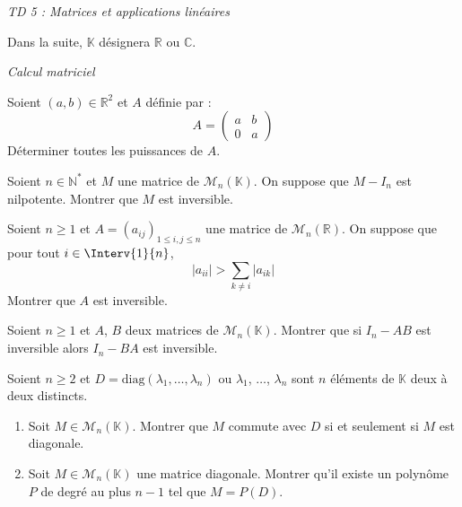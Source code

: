 \documentclass[a4paper,10pt]{report}
\begin{document}
\everymath{\displaystyle}

\begin{center}
\textit{{ {\huge TD 5 : Matrices et applications linéaires }}}
\end{center}

\bigskip

\noindent Dans la suite, $\mathbb{K}$ désignera $\mathbb{R}$ ou $\mathbb{C}$.

\medskip

\begin{center}
\textit{{ {\large Calcul matriciel}}}
\end{center}

\begin{Exercice}{} Soient $(a,b) \in \mathbb{R}^2$ et $A$ définie par :
$$ A = \begin{pmatrix}
a & b \\
0  & a
\end{pmatrix}$$ 
Déterminer toutes les puissances de $A$.
\end{Exercice}

\begin{Exercice}{} Soient $n \in \mathbb{N}^*$ et $M$ une matrice de $\mathcal{M}_n(\mathbb{K})$. On suppose que $M-I_n$ est nilpotente. Montrer que $M$ est inversible.
\end{Exercice}

 \begin{Exercice}{} Soient $n \geq 1$ et $A = (a_{ij})_{1 \leq i,j \leq n}$ une matrice de $\mathcal{M}_n(\mathbb{R})$. On suppose que pour tout $i \in \Interv{1}{n}$,
$$ \vert a_{ii} \vert > \sum_{k \neq i} \vert a_{ik} \vert $$
Montrer que $A$ est inversible.
\end{Exercice}

\begin{Exercice}{} Soient $n\geq 1$ et $A$, $B$ deux matrices de $\mathcal{M}_n(\mathbb{K})$. Montrer que si $I_n - AB$ est inversible alors $I_n - BA$ est inversible.
\end{Exercice} 

\begin{Exercice}{} Soient $n \geq 2$ et $D= \textrm{diag}(\lambda_1, \ldots, \lambda_n)$ ou $\lambda_1$, $\ldots$, $\lambda_n$ sont $n$ éléments de $\mathbb{K}$ deux à deux distincts.
\begin{enumerate}
\item Soit $M \in \mathcal{M}_n(\mathbb{K})$. Montrer que $M$ commute avec $D$ si et seulement si $M$ est diagonale.
\item Soit $M \in \mathcal{M}_n(\mathbb{K})$ une matrice diagonale. Montrer qu'il existe un polynôme $P$ de degré au plus $n-1$ tel que $M=P(D)$.
\end{enumerate}
\end{Exercice}
\end{document}
